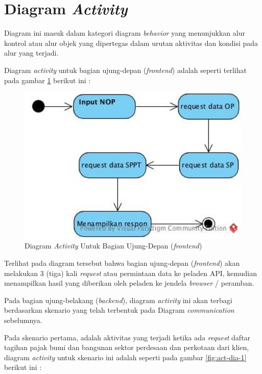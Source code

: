 \section{Diagram \textit{Activity}}

Diagram ini masuk dalam kategori diagram \textit{behavior} yang menunjukkan alur kontrol atau alur objek yang dipertegas dalam urutan aktivitas dan kondisi pada alur yang terjadi.

Diagram \textit{activity} untuk bagian ujung-depan (\textit{frontend}) adalah seperti terlihat pada gambar \ref{fig:act-dia-fe} berikut ini :

\begin{figure}[H]
	\centering
	\includegraphics[width=1\textwidth]{./resources/uml/act-dia-fe}
	\caption{Diagram \textit{Activity} Untuk Bagian Ujung-Depan (\textit{frontend})}
	\label{fig:act-dia-fe}
\end{figure}

Terlihat pada diagram tersebut bahwa bagian ujung-depan (\textit{frontend}) akan melakukan 3 (tiga) kali \textit{request} atau permintaan data ke peladen API, kemudian menampilkan hasil yang diberikan oleh peladen ke jendela \textit{browser} / peramban.

Pada bagian ujung-belakang (\textit{backend}), diagram \textit{activity} ini akan terbagi berdasarkan skenario yang telah terbentuk pada Diagram \textit{communication} sebelumnya.

Pada skenario pertama, adalah aktivitas yang terjadi ketika ada \textit{request} daftar tagihan pajak bumi dan bangunan sektor perdesaan dan perkotaan dari klien, diagram \textit{activity} untuk skenario ini adalah seperti pada gambar \ref{fig:act-dia-1} berikut ini :

